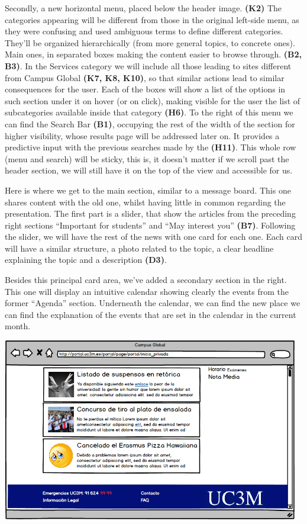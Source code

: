 \documentclass{article}
\begin{document}
Secondly, a new horizontal menu, placed below the header image. \textbf{(K2)} The categories appearing will be different from those in the original left-side menu, as they were confusing and used ambiguous terms to define different categories. They’ll be organized hierarchically (from more general topics, to concrete ones). Main ones, in separated boxes making the content easier to browse through. \textbf{(B2, B3)}. In the Services category we will include all those leading to sites different from Campus Global \textbf{(K7, K8, K10)}, so that similar actions lead to similar consequences for the user. Each of the boxes will show a list of the options in such section under it on hover (or on click), making visible for the user the list of subcategories available inside that category \textbf{(H6)}. To the right of this menu we can find the Search Bar \textbf{(B1)}, occupying the rest of the width of the section for higher visibility, whose results page will be addressed later on. It provides a predictive input with the previous searches made by the \textbf{(H11)}. This whole row (menu and search) will be sticky, this is, it doesn't matter if we scroll past the header section, we will still have it on the top of the view and accessible for us.

Here is where we get to the main section, similar to a message board. This one shares content with the old one, whilst having little in common regarding the presentation. The first part is a slider, that show the articles from the preceding right sections “Important for students” and “May interest you” \textbf{(B7)}. Following the slider, we will have the rest of the news with one card for each one. Each card will have a similar structure, a photo related to the topic, a clear headline explaining the topic and a description \textbf{(D3)}.

Besides this principal card area, we’ve added a secondary section in the right. This one will display an intuitive calendar showing clearly the events from the former “Agenda” section. Underneath the calendar, we can find the new place we can find the explanation of the events that are set in the calendar in the current month. 

\begin{center}
\includegraphics[width=13cm, height=8cm, keepaspectratio]{mockup_homepage_footer}
\end{center}
\end{document}
